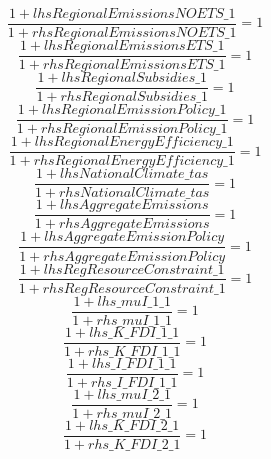 \begin{dmath}
\frac{1+{lhsRegionalEmissionsNOETS\_1}}{1+{rhsRegionalEmissionsNOETS\_1}}=1
\end{dmath}
\begin{dmath}
\frac{1+{lhsRegionalEmissionsETS\_1}}{1+{rhsRegionalEmissionsETS\_1}}=1
\end{dmath}
\begin{dmath}
\frac{1+{lhsRegionalSubsidies\_1}}{1+{rhsRegionalSubsidies\_1}}=1
\end{dmath}
\begin{dmath}
\frac{1+{lhsRegionalEmissionPolicy\_1}}{1+{rhsRegionalEmissionPolicy\_1}}=1
\end{dmath}
\begin{dmath}
\frac{1+{lhsRegionalEnergyEfficiency\_1}}{1+{rhsRegionalEnergyEfficiency\_1}}=1
\end{dmath}
\begin{dmath}
\frac{1+{lhsNationalClimate\_tas}}{1+{rhsNationalClimate\_tas}}=1
\end{dmath}
\begin{dmath}
\frac{1+{lhsAggregateEmissions}}{1+{rhsAggregateEmissions}}=1
\end{dmath}
\begin{dmath}
\frac{1+{lhsAggregateEmissionPolicy}}{1+{rhsAggregateEmissionPolicy}}=1
\end{dmath}
\begin{dmath}
\frac{1+{lhsRegResourceConstraint\_1}}{1+{rhsRegResourceConstraint\_1}}=1
\end{dmath}
\begin{dmath}
\frac{1+{lhs\_muI\_1\_1}}{1+{rhs\_muI\_1\_1}}=1
\end{dmath}
\begin{dmath}
\frac{1+{lhs\_K\_FDI\_1\_1}}{1+{rhs\_K\_FDI\_1\_1}}=1
\end{dmath}
\begin{dmath}
\frac{1+{lhs\_I\_FDI\_1\_1}}{1+{rhs\_I\_FDI\_1\_1}}=1
\end{dmath}
\begin{dmath}
\frac{1+{lhs\_muI\_2\_1}}{1+{rhs\_muI\_2\_1}}=1
\end{dmath}
\begin{dmath}
\frac{1+{lhs\_K\_FDI\_2\_1}}{1+{rhs\_K\_FDI\_2\_1}}=1
\end{dmath}
